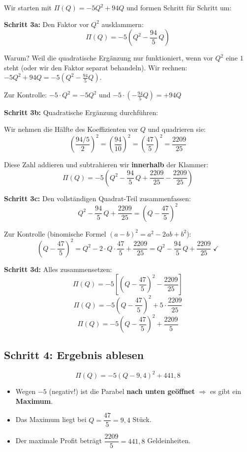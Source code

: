 \documentclass[12pt,a4paper]{article}
\begin{document}
Wir starten mit $\Pi(Q) = -5Q^2 + 94Q$ und formen Schritt f\"ur Schritt um:

\textbf{Schritt 3a:} Den Faktor vor $Q^2$ ausklammern:
\[
  \Pi(Q) = -5\left(Q^2 - \frac{94}{5}\,Q\right)
\]

Warum? Weil die quadratische Erg\"anzung nur funktioniert, wenn vor $Q^2$ eine $1$ steht (oder wir den Faktor separat behandeln). Wir rechnen:
$-5Q^2 + 94Q = -5\left(Q^2 - \frac{94}{5}Q\right)$.

Zur Kontrolle: $-5 \cdot Q^2 = -5Q^2$ \checkmark \quad und \quad $-5 \cdot \left(-\frac{94}{5}Q\right) = +94Q$ \checkmark

\bigskip

\textbf{Schritt 3b:} Quadratische Erg\"anzung durchf\"uhren:

Wir nehmen die H\"alfte des Koeffizienten vor $Q$ und quadrieren sie:
\[
  \left(\frac{94/5}{2}\right)^2 = \left(\frac{94}{10}\right)^2 = \left(\frac{47}{5}\right)^2 = \frac{2209}{25}
\]

Diese Zahl addieren und subtrahieren wir \textbf{innerhalb} der Klammer:
\[
  \Pi(Q) = -5\left(Q^2 - \frac{94}{5}\,Q + \frac{2209}{25} - \frac{2209}{25}\right)
\]

\textbf{Schritt 3c:} Den vollst\"andigen Quadrat-Teil zusammenfassen:
\[
  Q^2 - \frac{94}{5}\,Q + \frac{2209}{25} = \left(Q - \frac{47}{5}\right)^2
\]

Zur Kontrolle (binomische Formel $(a-b)^2 = a^2 - 2ab + b^2$):
\[
  \left(Q - \frac{47}{5}\right)^2 = Q^2 - 2 \cdot Q \cdot \frac{47}{5} + \frac{2209}{25} = Q^2 - \frac{94}{5}\,Q + \frac{2209}{25} \;\checkmark
\]

\textbf{Schritt 3d:} Alles zusammensetzen:
\[
  \Pi(Q) = -5\left[\left(Q - \frac{47}{5}\right)^2 - \frac{2209}{25}\right]
\]
\[
  \Pi(Q) = -5\left(Q - \frac{47}{5}\right)^2 + 5 \cdot \frac{2209}{25}
\]
\[
  \boxed{\Pi(Q) = -5\left(Q - \frac{47}{5}\right)^2 + \frac{2209}{5}}
\]

\subsection{Schritt 4: Ergebnis ablesen}

\begin{merkbox}[title={Ergebnis}]
\[
  \Pi(Q) = -5\left(Q - 9{,}4\right)^2 + 441{,}8
\]
\begin{itemize}
  \item Wegen $-5$ (negativ!) ist die Parabel \textbf{nach unten ge\"offnet} $\Rightarrow$ es gibt ein \textbf{Maximum}.
  \item Das Maximum liegt bei $Q = \dfrac{47}{5} = 9{,}4$ St\"uck.
  \item Der maximale Profit betr\"agt $\dfrac{2209}{5} = 441{,}8$ Geldeinheiten.
\end{itemize}
\end{merkbox}
\end{document}
